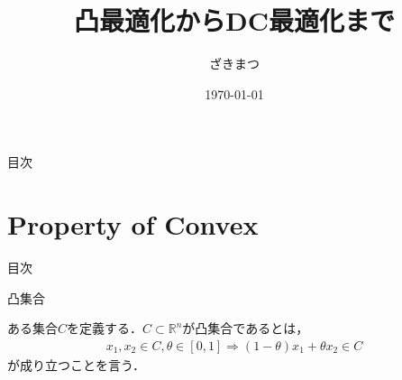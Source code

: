 \documentclass[aspectratio=169, dvipdfmx, 10.5pt]{beamer} %
\title{凸最適化からDC最適化まで}
\subtitle{}
\author{ざきまつ}
\institute{機械システムコース　修士1年}
\date{\today}
\begin{document}
\maketitle

\begin{frame}{目次}
    \tableofcontents
\end{frame}

\section{Property of Convex}
\begin{frame}{目次}
    \tableofcontents[currentsection]
\end{frame}

\begin{frame}{凸集合}
    \begin{definition}
		ある集合$C$を定義する．$C \subset \mathbb{R}^n$が凸集合であるとは，
		\begin{align*}
			x_1, x_2 \in C, \theta \in [0, 1] \Rightarrow (1-\theta) x_1 + \theta x_2 \in C
		\end{align*}
		が成り立つことを言う．
	\end{definition}


\end{frame}
\end{document}
